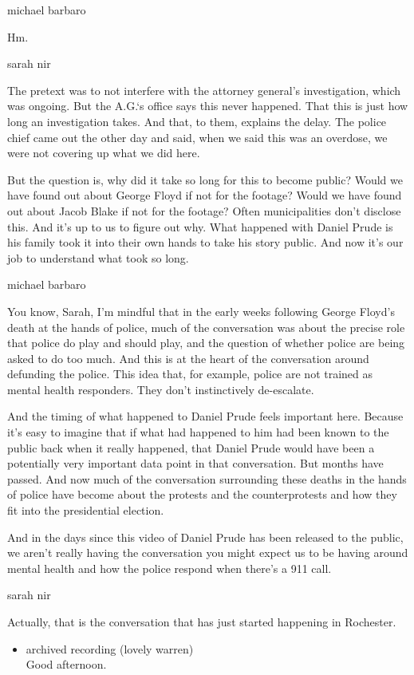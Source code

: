 michael barbaro

Hm.

sarah nir

The pretext was to not interfere with the attorney general's
investigation, which was ongoing. But the A.G.`s office says this never
happened. That this is just how long an investigation takes. And that,
to them, explains the delay. The police chief came out the other day and
said, when we said this was an overdose, we were not covering up what we
did here.

But the question is, why did it take so long for this to become public?
Would we have found out about George Floyd if not for the footage? Would
we have found out about Jacob Blake if not for the footage? Often
municipalities don't disclose this. And it's up to us to figure out why.
What happened with Daniel Prude is his family took it into their own
hands to take his story public. And now it's our job to understand what
took so long.

michael barbaro

You know, Sarah, I'm mindful that in the early weeks following George
Floyd's death at the hands of police, much of the conversation was about
the precise role that police do play and should play, and the question
of whether police are being asked to do too much. And this is at the
heart of the conversation around defunding the police. This idea that,
for example, police are not trained as mental health responders. They
don't instinctively de-escalate.

And the timing of what happened to Daniel Prude feels important here.
Because it's easy to imagine that if what had happened to him had been
known to the public back when it really happened, that Daniel Prude
would have been a potentially very important data point in that
conversation. But months have passed. And now much of the conversation
surrounding these deaths in the hands of police have become about the
protests and the counterprotests and how they fit into the presidential
election.

And in the days since this video of Daniel Prude has been released to
the public, we aren't really having the conversation you might expect us
to be having around mental health and how the police respond when
there's a 911 call.

sarah nir

Actually, that is the conversation that has just started happening in
Rochester.

\begin{itemize}
\tightlist
\item
  archived recording (lovely warren)\\
  Good afternoon.
\end{itemize}

